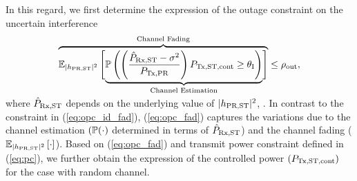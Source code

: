 In this regard, we first determine the expression of the outage constraint on the uncertain interference  
\begin{align}
\smash[b]{\overbrace{\e{\pgpo}{\smash[b]{\underbrace{\p\left( \left( \frac{\eprcvd - \nps}{\ptran}\right) \preg \ge \ite \right)}_{\text{Channel Estimation}}}}}^{\text{Channel Fading}}} \le \opc, \label{eq:opc_fad} \\[0.5em] \nonumber 
\end{align}
where $\hat{P}_{\text{Rx,ST}}$ depends on the underlying value of $|h_{\text{PR,ST}}|^2$, . In contrast to the constraint in (\ref{eq:opc_id_fad}), (\ref{eq:opc_fad}) captures the variations due to the channel estimation $(\mathbb P(\cdot)$ determined in terms of $\hat{P}_{\text{Rx,ST}}$) and the channel fading (${\mathbb E}_{|h_{\text{PR,ST}}|^2}\left[ \cdot \right]$). Based on (\ref{eq:opc_fad}) and transmit power constraint defined in (\ref{eq:pc}), we further obtain the expression of the controlled power $(P_{\text{Tx,ST,cont}})$ for the case with random channel.


